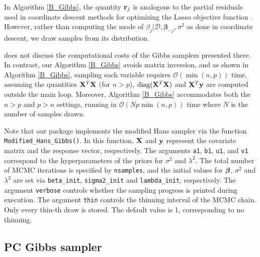 In Algorithm \ref{B_Gibbs}, the quantity ${\bf r}_j$ is analogous to the partial residuals used in coordinate descent methods for optimizing the Lasso objective function \cite[see, e.g.,][Section 5.4.2]{HasteEtAl2015}. However, rather than computing the mode of $\beta_j|{\mathcal D},{\boldsymbol\beta}_{-j},\sigma^2$ as done in coordinate descent, we draw samples from its distribution.

\citet{hans2009bayesian} does not discuss the computational costs of the Gibbs samplers presented there. In contrast, our Algorithm \ref{B_Gibbs} avoids matrix inversion, and as shown in Algorithm \ref{B_Gibbs}, sampling each variable requires $\mathcal{O}(\min(n,p))$  time, assuming the quantities ${\bf X}^T{\bf X}$ (for $n>p$), $\mbox{diag}({\bf X}^T{\bf X})$ and ${\bf X}^T{\bf y}$ are computed outside the main loop. Moreover, Algorithm \ref{B_Gibbs} accommodates both the $n>p$ and $p>n$  settings, running in $\mathcal{O}(N p \min(n,p))$ time where $N$ is the number of samples drawn.


Note that our  package implements the modified Hans sampler via the function
\texttt{Modified\_Hans\_Gibbs()}. In this function, ${\bf X}$ and ${\bf y}$ represent the covariate matrix and the response vector, respectively. The arguments \texttt{a1}, \texttt{b1}, \texttt{u1}, and \texttt{v1} correspond to the hyperparameters of the priors for $\sigma^2$ and $\lambda^2$. The total number of MCMC iterations is specified by \texttt{nsamples}, and the initial values for ${\boldsymbol \beta}$, $\sigma^2$ and $\lambda^2$ are set via {\tt beta\_init}, \texttt{sigma2\_init} and \texttt{lambda\_init}, respectively. The argument \texttt{verbose} controls whether the sampling progress is printed during execution. The argument \texttt{thin} controls the thinning interval of the MCMC chain. Only every thin-th draw is stored. The default value is 1, corresponding to no thinning.






\subsection{PC Gibbs sampler}
 
